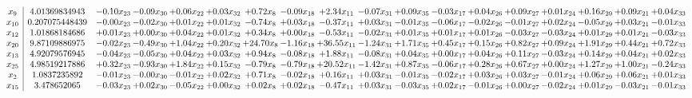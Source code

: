 \documentclass[9pt]{article}
\begin{document}
 \[\begin{array}{c| c c@{\hskip 2pt} c@{\hskip 2pt} c@{\hskip 2pt} c@{\hskip 2pt} c@{\hskip 2pt} c@{\hskip 2pt} c@{\hskip 2pt} c@{\hskip 2pt} c@{\hskip 2pt} c@{\hskip 2pt} c@{\hskip 2pt} c@{\hskip 2pt} c@{\hskip 2pt} c@{\hskip 2pt} c@{\hskip 2pt} c@{\hskip 2pt} }
 x_{9}   &  4.01369834943 & -0.10 x_{23} & -0.09 x_{30} & +  0.06 x_{22} & +  0.03 x_{32} & +  0.72 x_{8} & -0.09 x_{18} & +  2.34 x_{11} & -0.07 x_{31} & +  0.09 x_{35} & -0.03 x_{17} & +  0.04 x_{26} & +  0.09 x_{27} & +  0.01 x_{24} & +  0.16 x_{29} & +  0.09 x_{21} & +  0.04 x_{33}\\
 x_{10}   &  0.207075448439 & -0.00 x_{23} & -0.02 x_{30} & +  0.01 x_{22} & +  0.01 x_{32} & -0.74 x_{8} & +  0.03 x_{18} & -0.37 x_{11} & +  0.03 x_{31} & -0.01 x_{35} & -0.06 x_{17} & -0.02 x_{26} & -0.01 x_{27} & +  0.02 x_{24} & -0.05 x_{29} & +  0.03 x_{21} & -0.01 x_{33}\\
 x_{12}   &  1.01868184686 & +  0.01 x_{23} & +  0.00 x_{30} & +  0.04 x_{22} & +  0.01 x_{32} & +  0.34 x_{8} & +  0.00 x_{18} & -0.53 x_{11} & -0.02 x_{31} & +  0.01 x_{35} & +  0.01 x_{17} & +  0.01 x_{26} & -0.03 x_{27} & -0.03 x_{24} & +  0.01 x_{29} & +  0.01 x_{21} & -0.03 x_{33}\\
 x_{20}   &  9.87109886975 & -0.02 x_{23} & -0.49 x_{30} & +  1.04 x_{22} & +  0.20 x_{32} & + 24.70 x_{8} & -1.16 x_{18} & + 36.55 x_{11} & -1.24 x_{31} & +  1.71 x_{35} & +  0.45 x_{17} & +  0.15 x_{26} & +  0.82 x_{27} & +  0.09 x_{24} & +  1.91 x_{29} & +  0.44 x_{21} & +  0.72 x_{33}\\
 x_{13}   &  4.92079576945 & -0.04 x_{23} & -0.05 x_{30} & +  0.04 x_{22} & +  0.03 x_{32} & +  0.94 x_{8} & -0.08 x_{18} & +  1.88 x_{11} & -0.08 x_{31} & +  0.04 x_{35} & +  0.00 x_{17} & +  0.04 x_{26} & +  0.11 x_{27} & -0.03 x_{24} & +  0.14 x_{29} & +  0.04 x_{21} & +  0.02 x_{33}\\
 x_{25}   &  4.98519217886 & +  0.32 x_{23} & -0.93 x_{30} & +  1.84 x_{22} & +  0.15 x_{32} & -0.79 x_{8} & -0.79 x_{18} & + 20.52 x_{11} & -1.42 x_{31} & +  0.87 x_{35} & -0.06 x_{17} & +  0.28 x_{26} & +  0.67 x_{27} & +  0.00 x_{24} & +  1.27 x_{29} & +  1.00 x_{21} & -0.24 x_{33}\\
 x_{2}   &  1.0837235892 & -0.01 x_{23} & -0.00 x_{30} & -0.01 x_{22} & +  0.02 x_{32} & +  0.71 x_{8} & -0.02 x_{18} & +  0.16 x_{11} & +  0.03 x_{31} & -0.01 x_{35} & -0.02 x_{17} & +  0.03 x_{26} & +  0.03 x_{27} & -0.01 x_{24} & +  0.06 x_{29} & +  0.06 x_{21} & +  0.01 x_{33}\\
 x_{15}   &  3.478652065 & -0.03 x_{23} & +  0.02 x_{30} & -0.05 x_{22} & +  0.00 x_{32} & +  0.02 x_{8} & +  0.02 x_{18} & -0.47 x_{11} & +  0.03 x_{31} & -0.03 x_{35} & +  0.02 x_{17} & -0.01 x_{26} & +  0.00 x_{27} & -0.02 x_{24} & +  0.01 x_{29} & -0.03 x_{21} & -0.01 x_{33}\\

\end{array}\]
\end{document}
